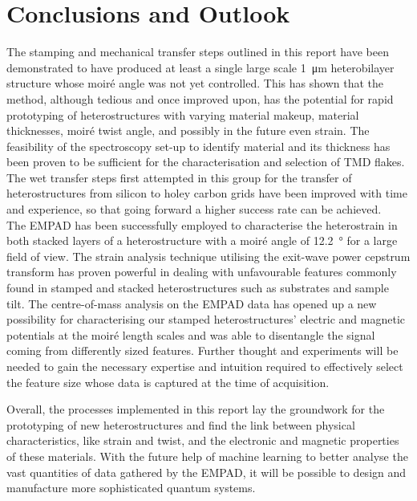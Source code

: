 \chapter{Conclusions and Outlook}
\label{sec:outlook}
The stamping and mechanical transfer steps outlined in this report have been demonstrated to have produced at least a single large scale \SI{1}{\micro\meter} heterobilayer structure whose moiré angle was not yet controlled. This has shown that the method, although tedious and once improved upon, has the potential for rapid prototyping of heterostructures with varying material makeup, material thicknesses, moiré twist angle, and possibly in the future even strain. The feasibility of the spectroscopy set-up to identify material and its thickness has been proven to be sufficient for the characterisation and selection of TMD flakes. The wet transfer steps first attempted in this group for the transfer of heterostructures from silicon to holey carbon grids have been improved with time and experience, so that going forward a higher success rate can be achieved.\\
The EMPAD has been successfully employed to characterise the heterostrain in both stacked layers of a heterostructure with a moiré angle of \SI{12.2}{\degree} for a large field of view. The strain analysis technique utilising the exit-wave power cepstrum transform has proven powerful in dealing with unfavourable features commonly found in stamped and stacked heterostructures such as substrates and sample tilt. The centre-of-mass analysis on the EMPAD data has opened up a new possibility for characterising our stamped heterostructures' electric and magnetic potentials at the moiré length scales and was able to disentangle the signal coming from differently sized features. Further thought and experiments will be needed to gain the necessary expertise and intuition required to effectively select the feature size whose data is captured at the time of acquisition.

Overall, the processes implemented in this report lay the groundwork for the prototyping of new heterostructures and find the link between physical characteristics, like strain and twist, and the electronic and magnetic properties of these materials. With the future help of machine learning to better analyse the vast quantities of data gathered by the EMPAD, it will be possible to design and manufacture more sophisticated quantum systems.
